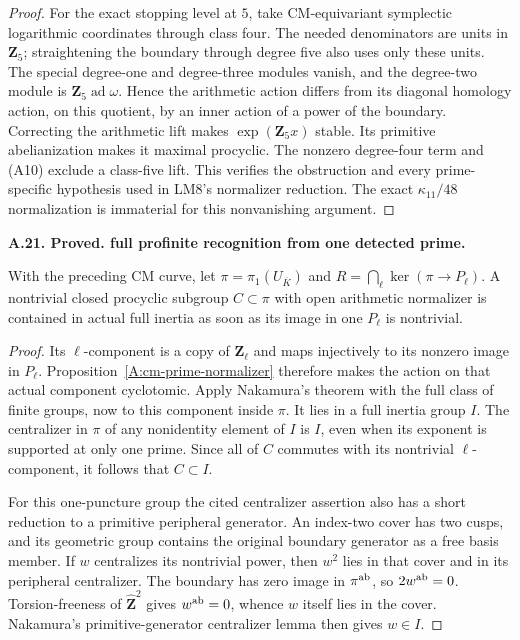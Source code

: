 \documentclass[11pt,oneside]{article}
\makeatletter
\newcounter{statementanchor}
\newenvironment{statement}[3]{%
 \refstepcounter{statementanchor}\def\@currentlabel{#1}%
 \par\addvspace{9pt}\noindent
 \textbf{#1. #2. #3.}\par\nobreak\noindent\ignorespaces
}{\par\addvspace{5pt}}
\makeatother
\begin{document}
\begin{proof}
For the exact stopping level at $5$, take
CM-equivariant symplectic logarithmic coordinates
through class four.  The needed denominators
are units in $\mathbf Z_5$; straightening the
boundary through degree five also uses only
these units.  The special degree-one and
degree-three modules vanish, and the
degree-two module is
$\mathbf Z_5\operatorname{ad}\omega$.
Hence the arithmetic action differs from
its diagonal homology action, on this
quotient, by an inner action of a power
of the boundary.  Correcting the arithmetic
lift makes $\exp(\mathbf Z_5x)$ stable.
Its primitive abelianization makes it
maximal procyclic.  The nonzero degree-four
term and (A10) exclude a class-five lift.
This verifies the obstruction and every
prime-specific hypothesis used in LM8's
normalizer reduction.  The exact
$\kappa_{11}/48$ normalization is immaterial
for this nonvanishing argument.
\end{proof}

\begin{statement}{A.21}{Proved}{full profinite recognition from one detected prime}
\label{st:A.21}
\label{A:cm-detected-normalizer}
With the preceding CM curve, let
$\pi=\pi_1(U_{\overline K})$ and
$R=\bigcap_\ell\ker(\pi\to P_\ell)$.
A nontrivial closed procyclic subgroup
$C\subset\pi$ with open arithmetic
normalizer is contained in actual full
inertia as soon as its image in one
$P_\ell$ is nontrivial.
\end{statement}
\begin{proof}
Its $\ell$-component is a copy of
$\mathbf Z_\ell$ and maps injectively to
its nonzero image in $P_\ell$.
Proposition~\ref{A:cm-prime-normalizer}
therefore makes the action on that actual
component cyclotomic.  Apply Nakamura's
theorem with the full class of finite
groups, now to this component inside
$\pi$.  It lies in a full inertia group
$I$.  The centralizer in $\pi$ of any
nonidentity element of $I$ is $I$, even
when its exponent is supported at only
one prime.  Since all of $C$ commutes
with its nontrivial $\ell$-component,
it follows that $C\subset I$.

For this one-puncture group the cited
centralizer assertion also has a short
reduction to a primitive peripheral
generator.  An index-two cover has two
cusps, and its geometric group contains
the original boundary generator as a
free basis member.  If $w$ centralizes
its nontrivial power, then $w^2$ lies
in that cover and in its peripheral
centralizer.  The boundary has zero
image in $\pi^{\rm ab}$, so
$2w^{\rm ab}=0$.  Torsion-freeness of
$\widehat{\mathbf Z}^2$ gives
$w^{\rm ab}=0$, whence $w$ itself
lies in the cover.  Nakamura's
primitive-generator centralizer lemma
then gives $w\in I$.
\end{proof}
\end{document}
